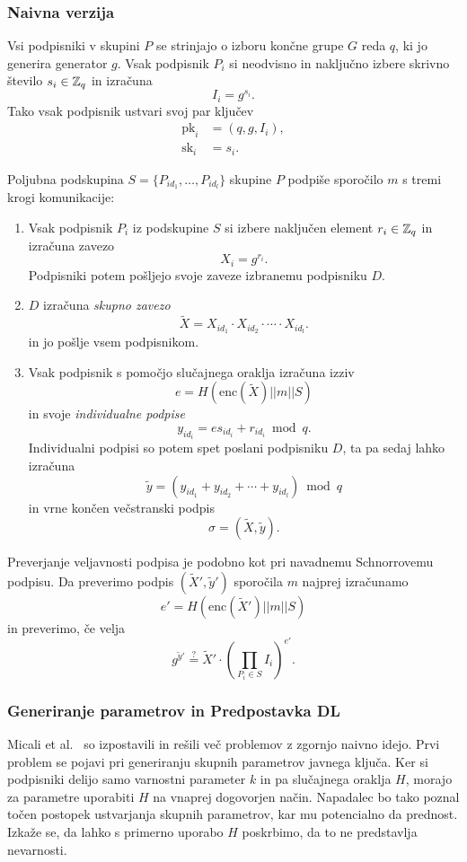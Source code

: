 \subsubsection{Naivna verzija}
Vsi podpisniki v skupini $P$ se strinjajo o izboru končne grupe $G$ reda $q$, ki jo generira generator
$g$. Vsak podpisnik $P_i$ si neodvisno in naključno izbere skrivno število $s_i \in \mathbb Z_q$ in izračuna 
$$
I_i = g^{s_i}.
$$
Tako vsak podpisnik ustvari svoj par ključev
\begin{align*}
    \text{pk}_i &= (q, g, I_i), \\
    \text{sk}_i &= s_i.
\end{align*}

Poljubna podskupina $S =\{P_{id_1}, \dots, P_{id_l}\}$ skupine $P$ podpiše sporočilo $m$ s tremi 
krogi komunikacije:
\begin{enumerate}
    \item Vsak podpisnik $P_i$ iz podskupine $S$ si izbere naključen element $r_i \in \mathbb Z_q$
        in izračuna zavezo
        $$
        X_i = g^{r_i}.
        $$
        Podpisniki potem pošljejo svoje zaveze izbranemu podpisniku $D$. 
    \item $D$ izračuna \textit{skupno zavezo} 
        $$ 
        \tilde{X} = X_{id_1} \cdot X_{id_2} \cdot \cdots \cdot X_{id_l}.
        $$
        in jo pošlje vsem podpisnikom.
    \item Vsak podpisnik s pomočjo slučajnega oraklja izračuna izziv 
        $$ 
        e = H(\text{enc}(\tilde{X}) || m || S)
        $$
        in svoje \textit{individualne podpise} 
        $$ 
        y_{id_i} = e s_{id_i} + r_{id_i} \bmod q.
        $$
        Individualni podpisi so potem spet poslani podpisniku $D$, ta pa sedaj lahko 
        izračuna 
        $$ 
        \tilde{y} = (y_{id_1} + y_{id_2} + \cdots + y_{id_l}) \bmod q 
        $$
        in vrne končen večstranski podpis
        $$ 
        \sigma = (\tilde{X}, \tilde{y}).
        $$
\end{enumerate}

Preverjanje veljavnosti podpisa je podobno kot pri navadnemu Schnorrovemu podpisu. Da preverimo 
podpis $(\tilde{X}', \tilde{y}')$ sporočila $m$ najprej izračunamo 
$$
e' = H(\text{enc}(\tilde{X}') || m || S)
$$
in preverimo, če velja
\begin{equation}
\label{eq:naive-ver}
g^{\tilde{y}'} \stackrel{?}{=} \tilde{X}' \cdot \left(\prod_{P_i \in S} I_i \right)^{e'}.
\end{equation}

\subsubsection{Generiranje parametrov in Predpostavka DL}
Micali et al.~\cite{micali2001asm} so izpostavili in rešili več problemov z zgornjo naivno idejo.
Prvi problem se pojavi pri generiranju skupnih parametrov javnega ključa. Ker si podpisniki
delijo samo varnostni parameter $k$ in pa slučajnega oraklja $H$, morajo za parametre uporabiti
$H$ na vnaprej dogovorjen način. Napadalec bo tako poznal točen postopek ustvarjanja skupnih
parametrov, kar mu potencialno da prednost. Izkaže se, da lahko s primerno uporabo $H$ poskrbimo,
da to ne predstavlja nevarnosti.

